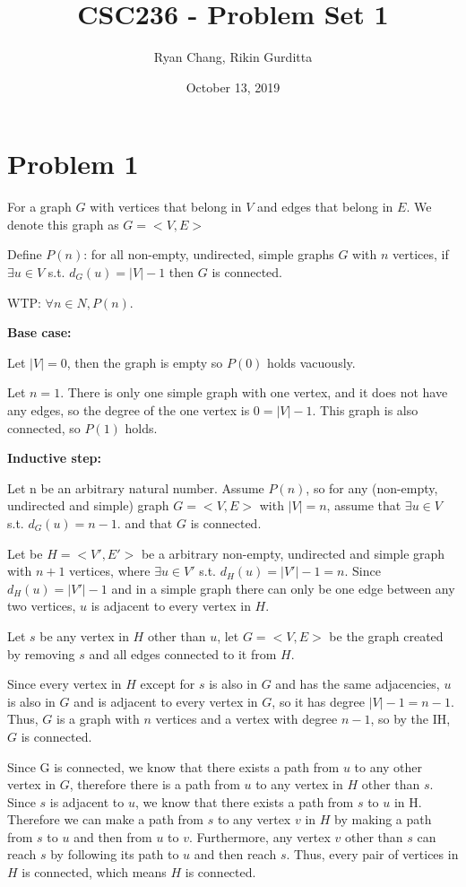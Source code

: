 \documentclass[12pt]{article}
\title{CSC236 - Problem Set 1}
\author{Ryan Chang, Rikin Gurditta}
\date{October 13, 2019}
\begin{document}
\maketitle

\newpage
\section*{Problem 1}

\noindent For a graph $G$ with vertices that belong in $V$ and edges that belong in $E$. We denote this graph as $G = <V,E>$

Define $P(n)$: for all non-empty, undirected, simple graphs $G$ with $n$ vertices, if $\exists u \in V$ s.t. $d_G(u) = |V| - 1$ then $G$ is connected.

\noindent WTP: $\forall n \in N, P(n)$.

\noindent \textbf{Base case:}

Let $|V| = 0$, then the graph is empty so $P(0)$ holds vacuously.

Let $n = 1$. There is only one simple graph with one vertex, and it does not have any edges, so the degree of the one vertex is $0 = |V| - 1$. This graph is also connected, so $P(1)$ holds.

\noindent \textbf{Inductive step:}

Let n be an arbitrary natural number. Assume $P(n)$, so for any (non-empty, undirected and simple) graph $G = <V, E>$ with $|V| = n$, assume that $\exists u \in V$ s.t. $d_G(u) = n - 1$. and that $G$ is connected.

Let be $H = <V', E'>$ be a arbitrary non-empty, undirected and simple graph with $n + 1$ vertices, where $\exists u \in V'$ s.t. $d_{H}(u) = |V'| - 1 = n$. Since $d_{H}(u) = |V'| - 1$ and in a simple graph there can only be one edge between any two vertices, $u$ is adjacent to every vertex in $H$.

Let $s$ be any vertex in $H$ other than $u$, let $G = <V, E>$ be the graph created by removing $s$ and all edges connected to it from $H$.

Since every vertex in $H$ except for $s$ is also in $G$ and has the same adjacencies, $u$ is also in $G$ and is adjacent to every vertex in $G$, so it has degree $|V| - 1 = n - 1$. Thus, $G$ is a graph with $n$ vertices and a vertex with degree $n - 1$, so by the IH, $G$ is connected.

Since G is connected, we know that there exists a path from $u$ to any other vertex in $G$, therefore there is a path from $u$ to any vertex in $H$ other than $s$. Since $s$ is adjacent to $u$, we know that there exists a path from $s$ to $u$ in H. Therefore we can make a path from $s$ to any vertex $v$ in $H$ by making a path from $s$ to $u$ and then from $u$ to $v$. Furthermore, any vertex $v$ other than $s$ can reach $s$ by following its path to $u$ and then reach $s$. Thus, every pair of vertices in $H$ is connected, which means $H$ is connected.
\end{document}

